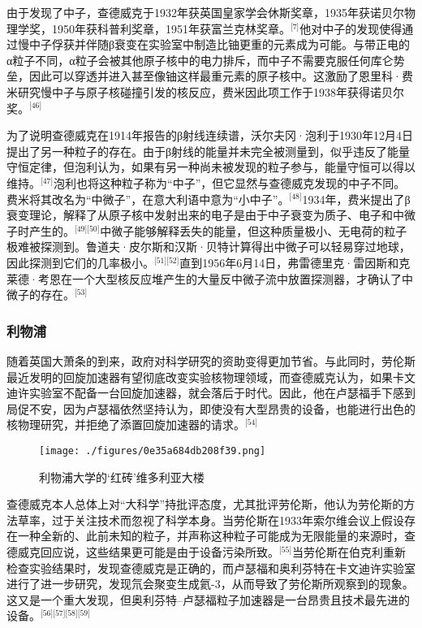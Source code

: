 由于发现了中子，查德威克于1932年获英国皇家学会休斯奖章，1935年获诺贝尔物理学奖，1950年获科普利奖章，1951年获富兰克林奖章。\(^\text{[7]}\)他对中子的发现使得通过慢中子俘获并伴随β衰变在实验室中制造比铀更重的元素成为可能。与带正电的α粒子不同，α粒子会被其他原子核中的电力排斥，而中子不需要克服任何库仑势垒，因此可以穿透并进入甚至像铀这样最重元素的原子核中。这激励了恩里科·费米研究慢中子与原子核碰撞引发的核反应，费米因此项工作于1938年获得诺贝尔奖。\(^\text{[46]}\)

为了说明查德威克在1914年报告的β射线连续谱，沃尔夫冈·泡利于1930年12月4日提出了另一种粒子的存在。由于β射线的能量并未完全被测量到，似乎违反了能量守恒定律，但泡利认为，如果有另一种尚未被发现的粒子参与，能量守恒可以得以维持。\(^\text{[47]}\)泡利也将这种粒子称为“中子”，但它显然与查德威克发现的中子不同。费米将其改名为“中微子”，在意大利语中意为“小中子”。\(^\text{[48]}\)1934年，费米提出了β衰变理论，解释了从原子核中发射出来的电子是由于中子衰变为质子、电子和中微子时产生的。\(^\text{[49][50]}\)中微子能够解释丢失的能量，但这种质量极小、无电荷的粒子极难被探测到。鲁道夫·皮尔斯和汉斯·贝特计算得出中微子可以轻易穿过地球，因此探测到它们的几率极小。\(^\text{[51][52]}\)直到1956年6月14日，弗雷德里克·雷因斯和克莱德·考恩在一个大型核反应堆产生的大量反中微子流中放置探测器，才确认了中微子的存在。\(^\text{[53]}\)
\subsubsection{利物浦}
随着英国大萧条的到来，政府对科学研究的资助变得更加节省。与此同时，劳伦斯最近发明的回旋加速器有望彻底改变实验核物理领域，而查德威克认为，如果卡文迪许实验室不配备一台回旋加速器，就会落后于时代。因此，他在卢瑟福手下感到局促不安，因为卢瑟福依然坚持认为，即使没有大型昂贵的设备，也能进行出色的核物理研究，并拒绝了添置回旋加速器的请求。\(^\text{[54]}\)
\begin{figure}[ht]
\centering
\texttt{[image: ./figures/0e35a684db208f39.png]}
\caption{利物浦大学的‘红砖’维多利亚大楼} \label{fig_ZMcdw_3}
\end{figure}
查德威克本人总体上对“大科学”持批评态度，尤其批评劳伦斯，他认为劳伦斯的方法草率，过于关注技术而忽视了科学本身。当劳伦斯在1933年索尔维会议上假设存在一种全新的、此前未知的粒子，并声称这种粒子可能成为无限能量的来源时，查德威克回应说，这些结果更可能是由于设备污染所致。\(^\text{[55]}\)当劳伦斯在伯克利重新检查实验结果时，发现查德威克是正确的，而卢瑟福和奥利芬特在卡文迪许实验室进行了进一步研究，发现氘会聚变生成氦-3，从而导致了劳伦斯所观察到的现象。这又是一个重大发现，但奥利芬特–卢瑟福粒子加速器是一台昂贵且技术最先进的设备。\(^\text{[56][57][58][59]}\)

